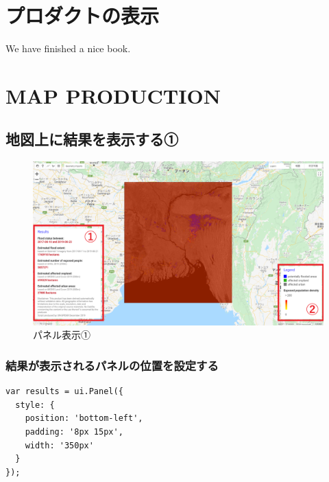 \documentclass[
]{book}
\begin{document}
\hypertarget{ux30d7ux30edux30c0ux30afux30c8ux306eux8868ux793a}{%
\chapter{プロダクトの表示}\label{ux30d7ux30edux30c0ux30afux30c8ux306eux8868ux793a}}

We have finished a nice book.

\hypertarget{map-production}{%
\chapter{MAP PRODUCTION}\label{map-production}}

\hypertarget{ux5730ux56f3ux4e0aux306bux7d50ux679cux3092ux8868ux793aux3059ux308bux2460}{%
\section{地図上に結果を表示する①}\label{ux5730ux56f3ux4e0aux306bux7d50ux679cux3092ux8868ux793aux3059ux308bux2460}}

\begin{figure}
\centering
\includegraphics{images/example1.png}
\caption{パネル表示①}
\end{figure}

\hypertarget{ux7d50ux679cux304cux8868ux793aux3055ux308cux308bux30d1ux30cdux30ebux306eux4f4dux7f6eux3092ux8a2dux5b9aux3059ux308b}{%
\subsection{結果が表示されるパネルの位置を設定する　　}\label{ux7d50ux679cux304cux8868ux793aux3055ux308cux308bux30d1ux30cdux30ebux306eux4f4dux7f6eux3092ux8a2dux5b9aux3059ux308b}}

\begin{verbatim}
var results = ui.Panel({
  style: {
    position: 'bottom-left',
    padding: '8px 15px',
    width: '350px'
  }
});
\end{verbatim}
\end{document}
